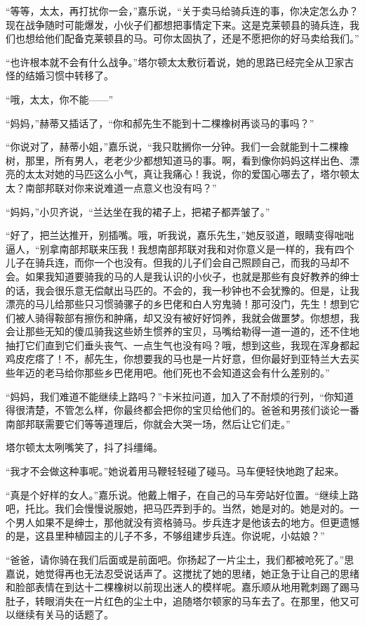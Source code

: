 \par “等等，太太，再打扰你一会，”嘉乐说，“关于卖马给骑兵连的事，你决定怎么办？现在战争随时可能爆发，小伙子们都想把事情定下来。这是克莱顿县的骑兵连，我们也想给他们配备克莱顿县的马。可你太固执了，还是不愿把你的好马卖给我们。”
\par “也许根本就不会有什么战争。”塔尔顿太太敷衍着说，她的思路已经完全从卫家古怪的结婚习惯中转移了。
\par “哦，太太，你不能——”
\par “妈妈，”赫蒂又插话了，“你和郝先生不能到十二棵橡树再谈马的事吗？”
\par “你说对了，赫蒂小姐，”嘉乐说，“我只耽搁你一分钟。我们一会就能到十二棵橡树，那里，所有男人，老老少少都想知道马的事。啊，看到像你妈妈这样出色、漂亮的太太对她的马匹这么小气，真让我痛心！我说，你的爱国心哪去了，塔尔顿太太？南部邦联对你来说难道一点意义也没有吗？”
\par “妈妈，”小贝齐说，“兰达坐在我的裙子上，把裙子都弄皱了。”
\par “好了，把兰达推开，别插嘴。哦，听我说，嘉乐先生，”她反驳道，眼睛变得咄咄逼人，“别拿南部邦联来压我！我想南部邦联对我和对你意义是一样的，我有四个儿子在骑兵连，而你一个也没有。但我的儿子们会自己照顾自己，而我的马却不会。如果我知道要骑我的马的人是我认识的小伙子，也就是那些有良好教养的绅士的话，我会很乐意无偿献出马匹的。不会的，我一秒钟也不会犹豫的。但是，让我漂亮的马儿给那些只习惯骑骡子的乡巴佬和白人穷鬼骑！那可没门，先生！想到它们被人骑得鞍部有擦伤和肿痛，却又没有被好好饲养，我就会做噩梦。你想想，我会让那些无知的傻瓜骑我这些娇生惯养的宝贝，马嘴给勒得一道一道的，还不住地抽打它们直到它们垂头丧气、一点生气也没有吗？哦，想到这些，我现在浑身都起鸡皮疙瘩了！不，郝先生，你想要我的马也是一片好意，但你最好到亚特兰大去买些年迈的老马给你那些乡巴佬用吧。他们死也不会知道这会有什么差别的。”
\par “妈妈，我们难道不能继续上路吗？”卡米拉问道，加入了不耐烦的行列，“你知道得很清楚，不管怎么样，你最终都会把你的宝贝给他们的。爸爸和男孩们谈论一番南部邦联需要它们等等道理后，你就会大哭一场，然后让它们走。”
\par 塔尔顿太太咧嘴笑了，抖了抖缰绳。
\par “我才不会做这种事呢。”她说着用马鞭轻轻碰了碰马。马车便轻快地跑了起来。
\par “真是个好样的女人。”嘉乐说。他戴上帽子，在自己的马车旁站好位置。“继续上路吧，托比。我们会慢慢说服她，把马匹弄到手的。当然，她是对的。她是对的。一个男人如果不是绅士，那他就没有资格骑马。步兵连才是他该去的地方。但更遗憾的是，这县里种植园主的儿子不多，不够组建步兵连。你说呢，小姑娘？”
\par “爸爸，请你骑在我们后面或是前面吧。你扬起了一片尘土，我们都被呛死了。”思嘉说，她觉得再也无法忍受说话声了。这搅扰了她的思绪，她正急于让自己的思绪和脸部表情在到达十二棵橡树以前现出迷人的模样呢。嘉乐顺从地用靴刺踢了踢马肚子，转眼消失在一片红色的尘土中，追随塔尔顿家的马车去了。在那里，他又可以继续有关马的话题了。


